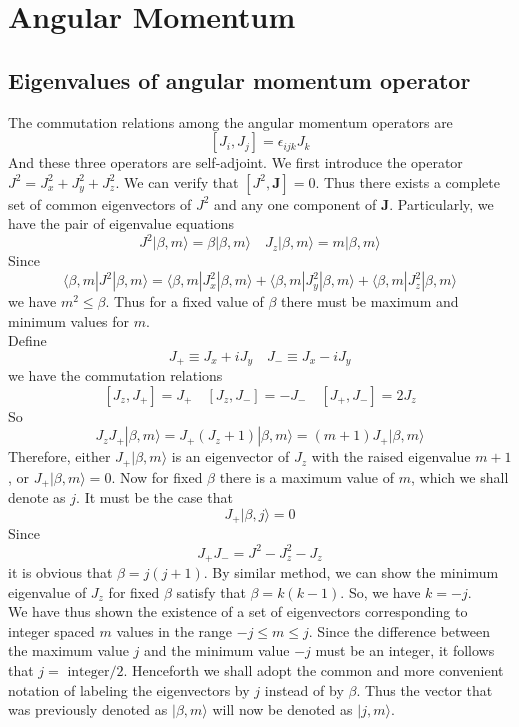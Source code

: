 \documentclass[cyan]{elegantnote}
\begin{document}
\chapter{Angular Momentum}
\section{Eigenvalues of angular momentum operator}
The commutation relations among the angular momentum operators are
\[[J_i,J_j] = \epsilon_{ijk} J_k\]
And these three operators are self-adjoint. We first introduce the operator $J^2 = J_x^2 + J_y^2 + J_z^2$. We can verify that $[J^2,\bm{J}] = 0$. Thus there exists a complete set of common eigenvectors of $J^2$ and any one component of $\bm{J}$. Particularly, we have the pair of eigenvalue equations
\[J^2 | \beta,m\rangle = \beta | \beta,m\rangle \quad J_z | \beta,m\rangle = m | \beta,m\rangle\]
Since
\[\langle \beta,m | J^2 | \beta,m \rangle = \langle \beta,m | J_x^2 | \beta,m \rangle + \langle \beta,m | J_y^2 | \beta,m \rangle + \langle \beta,m | J_z^2 | \beta,m \rangle\]
we have $m^2 \leq \beta$. Thus for a fixed value of $\beta$ there must be maximum and minimum values for $m$.\\
Define
\[J_+ \equiv J_x + iJ_y \quad J_- \equiv J_x - iJ_y\]
we have the commutation relations
\[[J_z,J_+] = J_+ \quad [J_z,J_-] = -J_- \quad [J_+,J_-] = 2J_z\]
So
\[J_z J_+ | \beta,m\rangle = J_+(J_z + 1)| \beta,m\rangle = (m+1)J_+| \beta,m\rangle\]
Therefore, either $J_+ | \beta,m\rangle$ is an eigenvector of $J_z$ with the raised eigenvalue $m+1$, or $J_+ | \beta,m\rangle = 0$. Now for fixed $\beta$ there is a maximum value of $m$, which we shall denote as $j$. It must be the case that
\[J_+ |\beta,j\rangle = 0\]
Since
\[J_+ J_- = J^2 - J_z^2 - J_z\]
it is obvious that $\beta = j(j+1)$. By similar method, we can show the minimum eigenvalue of $J_z$ for fixed $\beta$ satisfy that $\beta = k(k-1)$. So, we have $k = -j$. \\
We have thus shown the existence of a set of eigenvectors corresponding to integer spaced $m$ values in the range $-j \leq m \leq j$. Since the difference between the maximum value $j$ and the minimum value $-j$ must be an integer, it follows that $j = \mbox{ integer} / 2$. Henceforth we shall adopt the common and more convenient notation of labeling the eigenvectors by $j$ instead of by $\beta$. Thus the vector that was previously denoted as $|\beta,m\rangle$ will now be denoted as $|j,m\rangle$. 
\end{document}
